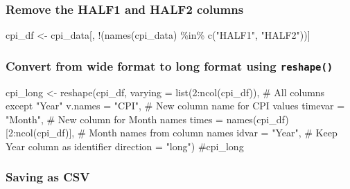 \documentclass[
  letterpaper,
  DIV=11,
  numbers=noendperiod]{scrartcl}
\newenvironment{Shaded}{\begin{snugshade}}{\end{snugshade}}
\newcommand{\AttributeTok}[1]{\textcolor[rgb]{0.40,0.45,0.13}{#1}}
\newcommand{\CommentTok}[1]{\textcolor[rgb]{0.37,0.37,0.37}{#1}}
\newcommand{\DecValTok}[1]{\textcolor[rgb]{0.68,0.00,0.00}{#1}}
\newcommand{\FunctionTok}[1]{\textcolor[rgb]{0.28,0.35,0.67}{#1}}
\newcommand{\NormalTok}[1]{\textcolor[rgb]{0.00,0.23,0.31}{#1}}
\newcommand{\OtherTok}[1]{\textcolor[rgb]{0.00,0.23,0.31}{#1}}
\newcommand{\SpecialCharTok}[1]{\textcolor[rgb]{0.37,0.37,0.37}{#1}}
\newcommand{\StringTok}[1]{\textcolor[rgb]{0.13,0.47,0.30}{#1}}
\begin{document}
\subsubsection{Remove the HALF1 and HALF2
columns}\label{remove-the-half1-and-half2-columns}

\begin{Shaded}
\begin{Highlighting}[]
\NormalTok{cpi\_df }\OtherTok{\textless{}{-}}\NormalTok{ cpi\_data[, }\SpecialCharTok{!}\NormalTok{(}\FunctionTok{names}\NormalTok{(cpi\_data) }\SpecialCharTok{\%in\%} \FunctionTok{c}\NormalTok{(}\StringTok{"HALF1"}\NormalTok{, }\StringTok{"HALF2"}\NormalTok{))]}
\end{Highlighting}
\end{Shaded}

\subsubsection{\texorpdfstring{Convert from wide format to long format
using
\texttt{reshape()}}{Convert from wide format to long format using reshape()}}\label{convert-from-wide-format-to-long-format-using-reshape}

\begin{Shaded}
\begin{Highlighting}[]
\NormalTok{cpi\_long }\OtherTok{\textless{}{-}} \FunctionTok{reshape}\NormalTok{(cpi\_df, }
                    \AttributeTok{varying =} \FunctionTok{list}\NormalTok{(}\DecValTok{2}\SpecialCharTok{:}\FunctionTok{ncol}\NormalTok{(cpi\_df)),  }\CommentTok{\# All columns except "Year"}
                    \AttributeTok{v.names =} \StringTok{"CPI"}\NormalTok{,  }\CommentTok{\# New column name for CPI values}
                    \AttributeTok{timevar =} \StringTok{"Month"}\NormalTok{,  }\CommentTok{\# New column for Month names}
                    \AttributeTok{times =} \FunctionTok{names}\NormalTok{(cpi\_df)[}\DecValTok{2}\SpecialCharTok{:}\FunctionTok{ncol}\NormalTok{(cpi\_df)],  }\CommentTok{\# Month names from column names}
                    \AttributeTok{idvar =} \StringTok{"Year"}\NormalTok{,  }\CommentTok{\# Keep Year column as identifier}
                    \AttributeTok{direction =} \StringTok{"long"}\NormalTok{)}
\CommentTok{\#cpi\_long}
\end{Highlighting}
\end{Shaded}

\subsubsection{Saving as CSV}\label{saving-as-csv}
\end{document}
